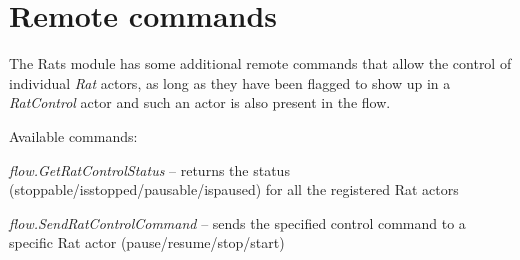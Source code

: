 \documentclass[a4paper]{book}
\begin{document}

\section{Remote commands}
The Rats module has some additional remote commands that allow the control of
individual \textit{Rat} actors, as long as they have been flagged to show up in a
\textit{RatControl} actor and such an actor is also present in the flow.

Available commands:
\begin{tight_itemize}
  \item \textit{flow.GetRatControlStatus} -- returns the status
  (stoppable/isstopped/pausable/ispaused) for all the registered Rat actors
  \item \textit{flow.SendRatControlCommand} -- sends the specified control command
  to a specific Rat actor (pause/resume/stop/start)
\end{tight_itemize}


\end{document}
